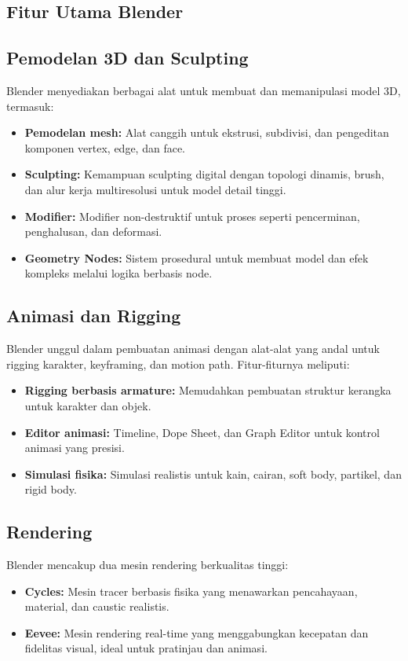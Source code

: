 \subsection{Fitur Utama Blender}

\subsection{Pemodelan 3D dan Sculpting}
Blender menyediakan berbagai alat untuk membuat dan memanipulasi model 3D, termasuk:
\begin{itemize}
    \item \textbf{Pemodelan mesh:} Alat canggih untuk ekstrusi, subdivisi, dan pengeditan komponen vertex, edge, dan face.
    \item \textbf{Sculpting:} Kemampuan sculpting digital dengan topologi dinamis, brush, dan alur kerja multiresolusi untuk model detail tinggi.
    \item \textbf{Modifier:} Modifier non-destruktif untuk proses seperti pencerminan, penghalusan, dan deformasi.
    \item \textbf{Geometry Nodes:} Sistem prosedural untuk membuat model dan efek kompleks melalui logika berbasis node.
\end{itemize}

\subsection{Animasi dan Rigging}
Blender unggul dalam pembuatan animasi dengan alat-alat yang andal untuk rigging karakter, keyframing, dan motion path. Fitur-fiturnya meliputi:
\begin{itemize}
    \item \textbf{Rigging berbasis armature:} Memudahkan pembuatan struktur kerangka untuk karakter dan objek.
    \item \textbf{Editor animasi:} Timeline, Dope Sheet, dan Graph Editor untuk kontrol animasi yang presisi.
    \item \textbf{Simulasi fisika:} Simulasi realistis untuk kain, cairan, soft body, partikel, dan rigid body.
\end{itemize}

\subsection{Rendering}
Blender mencakup dua mesin rendering berkualitas tinggi:
\begin{itemize}
    \item \textbf{Cycles:} Mesin tracer berbasis fisika yang menawarkan pencahayaan, material, dan caustic realistis.
    \item \textbf{Eevee:} Mesin rendering real-time yang menggabungkan kecepatan dan fidelitas visual, ideal untuk pratinjau dan animasi.
\end{itemize}

